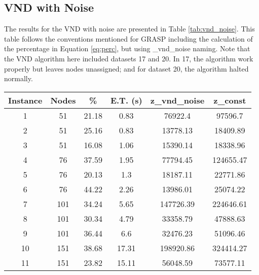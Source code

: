 \documentclass[10pt,twoside]{article}
\begin{document}
\subsection{VND with Noise}
The results for the VND with noise are presented in Table \ref{tab:vnd_noise}. This table follows the conventions mentioned for GRASP including the calculation of the percentage in Equation \ref{eq:perc}, but using \_vnd\_noise naming. Note that the VND algorithm here included datasets 17 and 20. In 17, the algorithm work properly but leaves nodes unassigned; and for dataset 20, the algorithm halted normally.
\begin{table}[H]
\centering
\begin{tabular}{cccccc}
\hline
\textbf{Instance} & \textbf{Nodes} & \textbf{\%} & \textbf{E.T. (s)} & \textbf{z\_vnd\_noise} & \textbf{z\_const} \\ \hline
1                 & 51             & 21.18       & 0.83              & 76922.4                & 97596.7           \\
2                 & 51             & 25.16       & 0.83              & 13778.13               & 18409.89          \\
3                 & 51             & 16.08       & 1.06              & 15390.14               & 18338.96          \\
4                 & 76             & 37.59       & 1.95              & 77794.45               & 124655.47         \\
5                 & 76             & 20.13       & 1.3               & 18187.11               & 22771.86          \\
6                 & 76             & 44.22       & 2.26              & 13986.01               & 25074.22          \\
7                 & 101            & 34.24       & 5.65              & 147726.39              & 224646.61         \\
8                 & 101            & 30.34       & 4.79              & 33358.79               & 47888.63          \\
9                 & 101            & 36.44       & 6.6               & 32476.23               & 51096.46          \\
10                & 151            & 38.68       & 17.31             & 198920.86              & 324414.27         \\
11                & 151            & 23.82       & 15.11             & 56048.59               & 73577.11          \\

\end{tabular}
\end{table}
\end{document}
